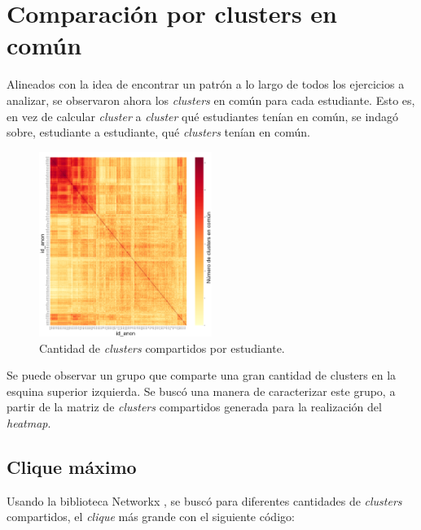\documentclass[11pt,a4paper,twoside,openany]{tesis}
\begin{document}
\section{Comparación por clusters en común}

Alineados con la idea de encontrar un patrón a lo largo de todos los ejercicios a analizar, se observaron ahora los \emph{clusters} en común para cada estudiante. Esto es, en vez de calcular \emph{cluster} a \emph{cluster} qué estudiantes tenían en común, se indagó sobre, estudiante a estudiante, qué \emph{clusters} tenían en común. 

\begin{figure}[H]

    \centering
    \includegraphics[width=0.5\textwidth]{imagenes/cluster.png}
    \caption{Cantidad de \emph{clusters} compartidos por estudiante.}
    \label{cluster}
\end{figure}

Se puede observar un grupo que comparte una gran cantidad de clusters en la esquina superior izquierda. Se buscó una manera de caracterizar este grupo, a partir de la matriz de \emph{clusters} compartidos generada para la realización del \emph{heatmap}. 


\subsection{Clique máximo}\textbf{ }
Usando la biblioteca Networkx \cite{networkx}, se buscó para diferentes cantidades de \emph{clusters} compartidos, el \emph{clique} más grande con el siguiente código:
\end{document}

